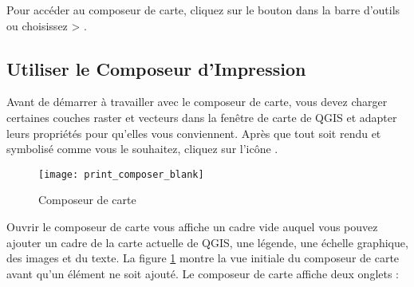 Pour acc\'eder au composeur de carte, cliquez sur le bouton
 dans la barre d'outils ou choisissez
 > .

\subsection{Utiliser le Composeur d'Impression}\label{label_useprintcomposer} 


Avant de d\'emarrer \`a travailler avec le composeur de carte, vous devez charger
certaines couches raster et vecteurs dans la fen\^etre de carte de QGIS et 
adapter leurs propri\'et\'es pour qu'elles vous conviennent. Apr\`es que tout soit
rendu et symbolis\'e comme vous le souhaitez, cliquez sur l'ic\^one 
.

\begin{figure}[ht]
   \begin{center}
    \caption{Composeur de carte\nixcaption}
\label{fig:print_composer_blank}\smallskip
   \texttt{[image: print\_composer\_blank]}
\end{center}
\end{figure}

Ouvrir le composeur de carte vous affiche un cadre vide auquel vous pouvez
ajouter un cadre de la carte actuelle de QGIS, une l\'egende, une \'echelle
graphique, des images et du texte. La figure \ref{fig:print_composer_blank}
montre la vue initiale du composeur de carte avant qu'un \'el\'ement ne soit
ajout\'e. Le composeur de carte affiche deux onglets :

